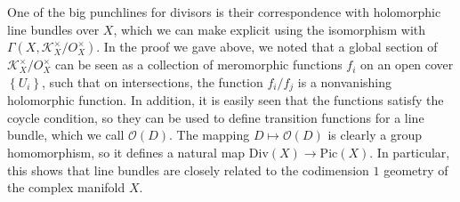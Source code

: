 \documentclass[psamsfonts, 12pt]{amsart}
\theoremstyle{definition}
\theoremstyle{remark}
\renewcommand{\O}{\mathcal{O}}
\newcommand{\set}[1]{\left\lbrace #1 \right\rbrace}
\begin{document}
%
One of the big punchlines for divisors is their correspondence with holomorphic
line bundles over $X$, which we can make explicit using the isomorphism with
$\Gamma(X, \mathcal{K}^\times_X / O^\times_X)$. In the proof we gave above, we noted
that a global section of $\mathcal{K}^\times_X / O^\times_X$ can be seen as a collection
of meromorphic functions $f_i$ on an open cover $\set{U_i}$, such that on intersections,
the function $f_i/f_j$ is a nonvanishing holomorphic function. In addition, it is easily
seen that the functions satisfy the coycle condition, so they can be used
to define transition functions for a line bundle, which we call $\O(D)$. The
mapping $D \mapsto \O(D)$ is clearly a group homomorphism, so it defines a natural
map $\mathrm{Div}(X) \to \mathrm{Pic}(X)$. In particular, this shows that line bundles
are closely related to the codimension $1$ geometry of the complex manifold $X$.
%
%
\end{document}
